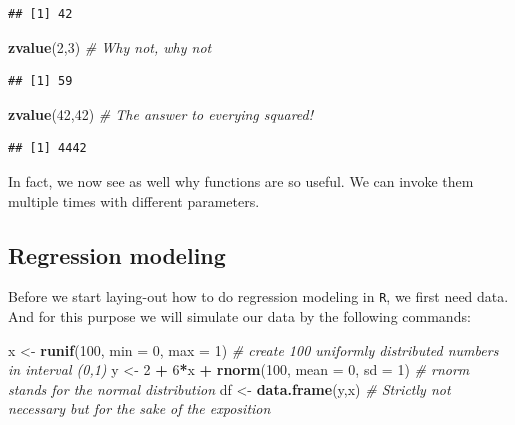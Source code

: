 \documentclass[]{article}
\newenvironment{Shaded}{\begin{snugshade}}{\end{snugshade}}
\newcommand{\KeywordTok}[1]{\textcolor[rgb]{0.13,0.29,0.53}{\textbf{#1}}}
\newcommand{\DataTypeTok}[1]{\textcolor[rgb]{0.13,0.29,0.53}{#1}}
\newcommand{\DecValTok}[1]{\textcolor[rgb]{0.00,0.00,0.81}{#1}}
\newcommand{\StringTok}[1]{\textcolor[rgb]{0.31,0.60,0.02}{#1}}
\newcommand{\CommentTok}[1]{\textcolor[rgb]{0.56,0.35,0.01}{\textit{#1}}}
\newcommand{\OperatorTok}[1]{\textcolor[rgb]{0.81,0.36,0.00}{\textbf{#1}}}
\newcommand{\NormalTok}[1]{#1}
\theoremstyle{definition}
\theoremstyle{definition}
\theoremstyle{definition}
\theoremstyle{remark}
\begin{document}
\begin{verbatim}
## [1] 42
\end{verbatim}

\begin{Shaded}
\begin{Highlighting}[]
\KeywordTok{zvalue}\NormalTok{(}\DecValTok{2}\NormalTok{,}\DecValTok{3}\NormalTok{) }\CommentTok{# Why not, why not}
\end{Highlighting}
\end{Shaded}

\begin{verbatim}
## [1] 59
\end{verbatim}

\begin{Shaded}
\begin{Highlighting}[]
\KeywordTok{zvalue}\NormalTok{(}\DecValTok{42}\NormalTok{,}\DecValTok{42}\NormalTok{) }\CommentTok{# The answer to everying squared!}
\end{Highlighting}
\end{Shaded}

\begin{verbatim}
## [1] 4442
\end{verbatim}

In fact, we now see as well why functions are so useful. We can invoke
them multiple times with different parameters.

\subsection{Regression modeling}\label{regression-modeling}

Before we start laying-out how to do regression modeling in \texttt{R},
we first need data. And for this purpose we will simulate our data by
the following commands:

\begin{Shaded}
\begin{Highlighting}[]
\NormalTok{x <-}\StringTok{ }\KeywordTok{runif}\NormalTok{(}\DecValTok{100}\NormalTok{, }\DataTypeTok{min =} \DecValTok{0}\NormalTok{, }\DataTypeTok{max =} \DecValTok{1}\NormalTok{) }\CommentTok{# create 100 uniformly distributed numbers in interval (0,1)}
\NormalTok{y <-}\StringTok{ }\DecValTok{2} \OperatorTok{+}\StringTok{ }\DecValTok{6}\OperatorTok{*}\NormalTok{x }\OperatorTok{+}\StringTok{ }\KeywordTok{rnorm}\NormalTok{(}\DecValTok{100}\NormalTok{, }\DataTypeTok{mean =} \DecValTok{0}\NormalTok{, }\DataTypeTok{sd =} \DecValTok{1}\NormalTok{) }\CommentTok{# rnorm stands for the normal distribution}
\NormalTok{df <-}\StringTok{ }\KeywordTok{data.frame}\NormalTok{(y,x) }\CommentTok{# Strictly not necessary but for the sake of the exposition}
\end{Highlighting}
\end{Shaded}
\end{document}
